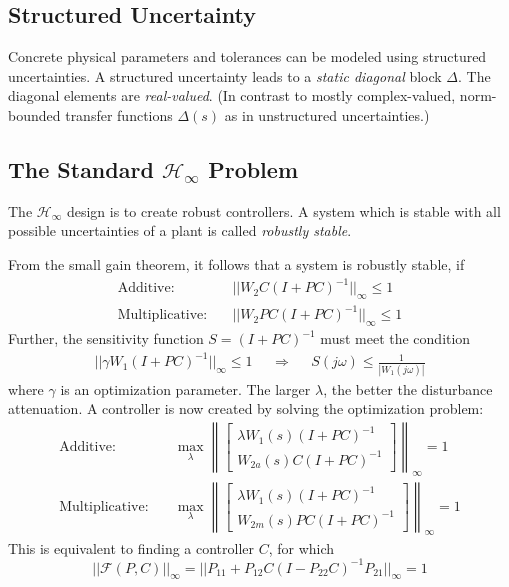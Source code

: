 \subsection{Structured Uncertainty}
Concrete physical parameters and tolerances can be modeled using structured uncertainties.
A structured uncertainty leads to a \emph{static diagonal} block $\Delta$. The diagonal
elements are \emph{real-valued}.
(In contrast to mostly complex-valued, norm-bounded transfer functions $\Delta(s)$ as in unstructured uncertainties.)

\subsection{The Standard $\boldsymbol{\mathcal{H}}_{\boldsymbol{\infty}}$ Problem}
The $\mathcal{H}_{\infty}$ design is to create robust controllers. 
A system which is stable with all possible uncertainties of a plant is called
\emph{robustly stable}.

From the small gain theorem, it follows that a system is robustly stable, if
\begin{align*}
    \text{Additive:}\quad&
    ||W_2 C(I+PC)^{-1}||_{\infty} \leq 1 \\
    \text{Multiplicative:}\quad&
    ||W_2 PC(I+PC)^{-1}||_{\infty} \leq 1
\end{align*}
Further, the sensitivity function $S=(I+PC)^{-1}$ must meet the condition
\begin{align*}
    || \gamma W_1 (I+PC)^{-1} ||_{\infty} \leq 1 
    && \Rightarrow &&
    S(j\omega) \leq \frac{1}{|W_1(j\omega)|}
\end{align*}
where $\gamma$ is an optimization parameter. 
The larger $\lambda$, the better the disturbance attenuation.
A controller is now created by solving the optimization problem:
\begin{align*}
    \text{Additive:}\quad&
    \max_{\lambda} \left\lVert \begin{bmatrix}
        \lambda W_1(s) (I+PC)^{-1} \\
        W_{2a}(s) C (I+PC)^{-1}
    \end{bmatrix} \right\rVert_{\infty} = 1
    \\
    \text{Multiplicative:}\quad&
    \max_{\lambda} \left\lVert \begin{bmatrix}
        \lambda W_1(s) (I+PC)^{-1} \\
        W_{2m}(s) PC (I+PC)^{-1}
    \end{bmatrix} \right\rVert_{\infty} = 1
\end{align*}
This is equivalent to finding a controller $C$, for which
\[
    ||\mathcal{F}(P,C)||_{\infty} = ||P_{11} + P_{12}C(I-P_{22}C)^{-1} P_{21}||_{\infty} = 1
\]

